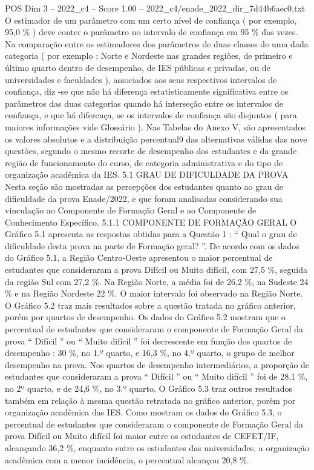 \begin{textsample}{POS Dim 3 – 2022\_c4 – Score 1.00 – 2022\_c4/enade\_2022\_dir\_7d44b6aec0.txt}
O estimador de um parâmetro com um certo nível de confiança ( por exemplo, 95,0 \% ) deve conter o parâmetro no intervalo de confiança em 95 \% das vezes.
Na comparação entre os estimadores dos parâmetros de duas classes de uma dada categoria ( por exemplo : Norte e Nordeste nas grandes regiões, de primeiro e último quarto dentro de desempenho, de IES públicas e privadas, ou de universidades e faculdades ), associados aos seus respectivos intervalos de confiança, diz -se que não há diferença estatisticamente significativa entre os parâmetros das duas categorias quando há interseção entre os intervalos de confiança, e que há diferença, se os intervalos de confiança são disjuntos ( para maiores informações vide Glossário ).
Nas Tabelas do Anexo V, são apresentados os valores absolutos e a distribuição percentual9 das alternativas válidas das nove questões, segundo o mesmo recorte de desempenho dos estudantes e da grande região de funcionamento do curso, de categoria administrativa e do tipo de organização acadêmica da IES. 5.1 GRAU DE DIFICULDADE DA PROVA Nesta seção são mostradas as percepções dos estudantes quanto ao grau de dificuldade da prova Enade/2022, e que foram analisadas considerando sua vinculação ao Componente de Formação Geral e ao Componente de Conhecimento Específico. 5.1.1 COMPONENTE DE FORMAÇÃO GERAL O Gráfico 5.1 apresenta as respostas obtidas para a Questão 1 : “ Qual o grau de dificuldade desta prova na parte de Formação geral? ”.
De acordo com os dados do Gráfico 5.1, a Região Centro-Oeste apresentou o maior percentual de estudantes que consideraram a prova Difícil ou Muito difícil, com 27,5 \%, seguida da região Sul com 27,2 \%.
Na Região Norte, a média foi de 26,2 \%, na Sudeste 24 \% e na Região Nordeste 22 \%.
O maior intervalo foi observado na Região Norte.
O Gráfico 5.2 traz mais resultados sobre a questão tratada no gráfico anterior, porém por quartos de desempenho.
Os dados do Gráfico 5.2 mostram que o percentual de estudantes que consideraram o componente de Formação Geral da prova “ Difícil ” ou “ Muito difícil ” foi decrescente em função dos quartos de desempenho : 30 \%, no 1.º quarto, e 16,3 \%, no 4.º quarto, o grupo de melhor desempenho na prova.
Nos quartos de desempenho intermediários, a proporção de estudantes que consideraram a prova “ Difícil ” ou “ Muito difícil ” foi de 28,1 \%, no 2º quarto, e de 24,6 \%, no 3.º quarto.
O Gráfico 5.3 traz outros resultados também em relação à mesma questão retratada no gráfico anterior, porém por organização acadêmica das IES.
Como mostram os dados do Gráfico 5.3, o percentual de estudantes que consideraram o componente de Formação Geral da prova Difícil ou Muito difícil foi maior entre os estudantes de CEFET/IF, alcançando 36,2 \%, enquanto entre os estudantes das universidades, a organização acadêmica com a menor incidência, o percentual alcançou 20,8 \%.

\end{textsample}
